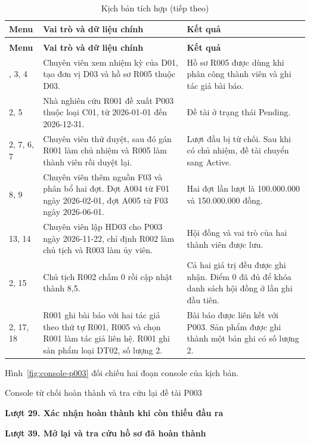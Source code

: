 {\small\singlespacing
\begin{longtable}{@{}P{.13\linewidth}P{.40\linewidth}P{.37\linewidth}@{}}
\caption{Kịch bản tích hợp trên đề tài P003}\label{tab:demo-workflow}\\
\toprule
\textbf{Menu} & \textbf{Vai trò và dữ liệu chính} & \textbf{Kết quả} \\
\midrule
\endfirsthead
\caption[]{Kịch bản tích hợp (tiếp theo)}\\
\toprule
\textbf{Menu} & \textbf{Vai trò và dữ liệu chính} & \textbf{Kết quả} \\
\midrule
\endhead
\bottomrule
{}, 3, 4 & Chuyên viên xem nhiệm kỳ của D01, tạo đơn vị D03 và hồ sơ R005 thuộc D03. & Hồ sơ R005 được dùng khi phân công thành viên và ghi tác giả bài báo. \\
2, 5 & Nhà nghiên cứu R001 đề xuất P003 thuộc loại C01, từ 2026-01-01 đến 2026-12-31. & Đề tài ở trạng thái Pending. \\
2, 7, 6, 7 & Chuyên viên thử duyệt, sau đó gán R001 làm chủ nhiệm và R005 làm thành viên rồi duyệt lại. & Lượt đầu bị từ chối. Sau khi có chủ nhiệm, đề tài chuyển sang Active. \\
8, 9 & Chuyên viên thêm nguồn F03 và phân bổ hai đợt. Đợt A004 từ F01 ngày 2026-02-01, đợt A005 từ F03 ngày 2026-06-01. & Hai đợt lần lượt là 100.000.000 và 150.000.000 đồng. \\
13, 14 & Chuyên viên lập HD03 cho P003 ngày 2026-11-22, chỉ định R002 làm chủ tịch và R003 làm ủy viên. & Hội đồng và vai trò của hai thành viên được lưu. \\
2, 15 & Chủ tịch R002 chấm 0 rồi cập nhật thành 8,5. & Cả hai giá trị đều được ghi nhận. Điểm 0 đã đủ để khóa danh sách hội đồng ở lần ghi đầu tiên. \\
2, 17, 18 & R001 ghi bài báo với hai tác giả theo thứ tự R001, R005 và chọn R001 làm tác giả liên hệ. R001 ghi sản phẩm loại DT02, số lượng 2. & Bài báo được liên kết với P003. Sản phẩm được ghi thành một bản ghi có số lượng 2. \\
\end{longtable}
}

Hình~\ref{fig:console-p003} đối chiếu hai đoạn console của kịch bản.

\begin{ReportFigureHere}
  \caption{Console từ chối hoàn thành và tra cứu lại đề tài P003}
  \label{fig:console-p003}
  {\small\noindent\textbf{Lượt 29. Xác nhận hoàn thành khi còn thiếu đầu ra}\par}
  {\small\noindent\textbf{Lượt 39. Mở lại và tra cứu hồ sơ đã hoàn thành}\par}
\end{ReportFigureHere}

